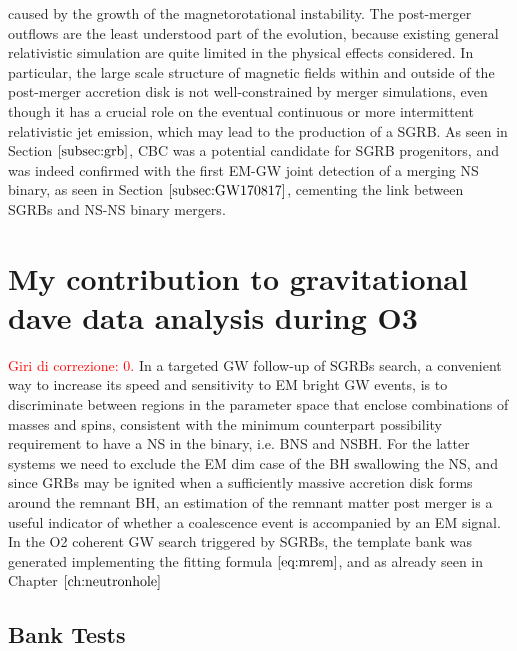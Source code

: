 \documentclass[binding=0.6cm, LaM]{sapthesis}
\newcommand{\fpg}[1]{\textcolor{red}{#1} }
\begin{document}
        caused by the growth of the magnetorotational instability.
        The post-merger outflows are the least understood part of the evolution,
        because existing general relativistic simulation are quite limited in the physical effects considered.
        In particular, the large scale structure of magnetic fields within and outside of the post-merger accretion disk
        is not well-constrained by merger simulations, even though it has a crucial role on the eventual continuous or more intermittent relativistic jet emission,
        which may lead to the production of a SGRB.
        As seen in Section $\ref{subsec:grb}$, CBC was a potential candidate for SGRB progenitors,
        and was indeed confirmed with the first EM-GW joint detection of a merging NS binary,
        as seen in Section $\ref{subsec:GW170817}$, cementing the link between SGRBs and NS-NS binary mergers.
	



\chapter{My contribution to gravitational dave data analysis during O3}
\fpg{Giri di correzione: 0.}%
	In a targeted GW follow-up of SGRBs search, a convenient way to increase its speed and sensitivity to EM bright GW events, 
	is to discriminate between regions in the parameter space that enclose combinations of masses and spins, 
	consistent with the minimum counterpart possibility requirement to have a NS in the binary, i.e. BNS and NSBH.
	For the latter systems we need to exclude the EM dim case of the BH swallowing the NS,
	and since GRBs may be ignited when a sufficiently massive accretion disk forms around the remnant BH, 
	an estimation of the remnant matter post merger is a useful indicator of whether a coalescence event is accompanied by an EM signal.         
	In the O2 coherent GW search triggered by SGRBs, the template bank was generated implementing the fitting formula $\ref{eq:mrem}$,
	and as already seen in Chapter $\ref{ch:neutronhole}$  

\section{Bank Tests}
\end{document}
